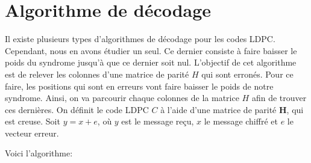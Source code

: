 \documentclass[french,nochapter,11pt]{rapportUB}
\begin{document}
\section{Algorithme de décodage}
\label{sec:algo}
Il existe plusieurs types d'algorithmes de décodage pour les codes LDPC. Cependant, nous en avons étudier un seul.
Ce dernier consiste à faire baisser le poids du syndrome jusqu'à que ce dernier soit nul. L'objectif de cet algorithme 
est de relever les colonnes d'une matrice de parité $H$ qui sont erronés.
Pour ce faire, les positions qui sont en erreurs vont faire baisser le poids de notre syndrome. Ainsi, on va parcourir 
chaque colonnes de la matrice $H$ afin de trouver ces dernières.
On définit le code LDPC $C$ à l'aide d'une matrice de parité \textbf{H}, qui est creuse.
Soit $y = x + e$, où $y$ est le message reçu, $x$ le message chiffré et $e$ le vecteur erreur.\vspace{0.4cm}\newline

Voici l'algorithme:\vspace{0.4cm}\newline
\end{document}
